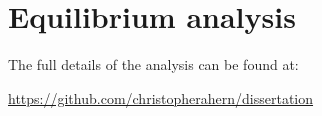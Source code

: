    
\chapter{Equilibrium analysis}
\label{Equilibrium Analysis}

    
The full details of the analysis can be found at:

 \url{https://github.com/christopherahern/dissertation}